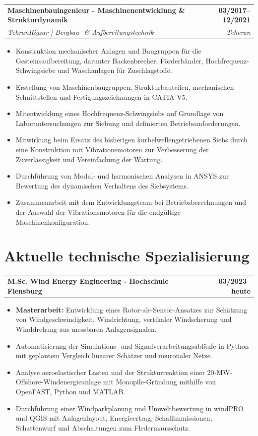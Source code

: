 \documentclass[10pt,a4paper]{article}
\makeatletter
\newcommand{\cvjob}[4]{%
  \begin{tabularx}{\linewidth}{@{}Xr@{}}
    \textbf{#1} & \textbf{#2}\\[-1pt]
    \textit{#3} & \textit{#4}
  \end{tabularx}
  \vspace{0.05em}
}
\newcommand{\cvproject}[2]{%
  \begin{tabularx}{\linewidth}{@{}Xr@{}}
    \textbf{#1} & \textbf{#2}
  \end{tabularx}
  \vspace{0.05em}
}
\makeatother
\begin{document}
\cvjob{Maschinenbauingenieur - Maschinenentwicklung \& Strukturdynamik}{03/2017--12/2021}{TehranRigzar | Bergbau- \& Aufbereitungstechnik}{Teheran}
\begin{itemize}
  \item Konstruktion mechanischer Anlagen und Baugruppen für die Gesteinsaufbereitung, darunter Backenbrecher, Förderbänder, Hochfrequenz-Schwingsiebe und Waschanlagen für Zuschlagstoffe.

  \item Erstellung von Maschinenbaugruppen, Strukturbauteilen, mechanischen Schnittstellen und Fertigungszeichnungen in CATIA V5.

  \item Mitentwicklung eines Hochfrequenz-Schwingsiebs auf Grundlage von Laboruntersuchungen zur Siebung und definierten Betriebsanforderungen.

  \item Mitwirkung beim Ersatz des bisherigen kurbelwellengetriebenen Siebs durch eine Konstruktion mit Vibrationsmotoren zur Verbesserung der Zuverlässigkeit und Vereinfachung der Wartung.

  \item Durchführung von Modal- und harmonischen Analysen in ANSYS zur Bewertung des dynamischen Verhaltens des Siebsystems.

  \item Zusammenarbeit mit dem Entwicklungsteam bei Betriebsberechnungen und der Auswahl der Vibrationsmotoren für die endgültige Maschinenkonfiguration.

\end{itemize}

\newpage

\section{Aktuelle technische Spezialisierung}
\cvproject{M.Sc. Wind Energy Engineering - Hochschule Flensburg}{03/2023--heute}
\begin{itemize}
  \item \textbf{Masterarbeit:} Entwicklung eines Rotor-als-Sensor-Ansatzes zur Schätzung von Windgeschwindigkeit, Windrichtung, vertikaler Windscherung und Winddrehung aus messbaren Anlagensignalen.

  \item Automatisierung der Simulations- und Signalverarbeitungsabläufe in Python mit geplantem Vergleich linearer Schätzer und neuronaler Netze.

  \item Analyse aeroelastischer Lasten und der Strukturreaktion einer 20-MW-Offshore-Windenergieanlage mit Monopile-Gründung mithilfe von OpenFAST, Python und MATLAB.

  \item Durchführung einer Windparkplanung und Umweltbewertung in windPRO und QGIS mit Anlagenlayout, Energieertrag, Schallimmissionen, Schattenwurf und Abschaltungen zum Fledermausschutz.
\end{itemize}
\end{document}
